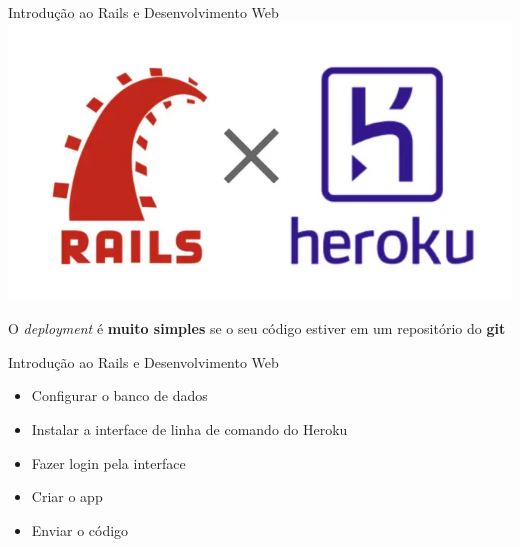 \documentclass[10pt]{beamer}
\begin{document}
\begin{frame}{Introdução ao Rails e Desenvolvimento Web}
  \centering
  \includegraphics[width=\textwidth]{images/rails_heroku.png}

  \raggedright
  O \textit{deployment} é \textbf{muito simples} se o seu código estiver em um repositório do \textbf{git}
\end{frame}

\begin{frame}{Introdução ao Rails e Desenvolvimento Web}
  \Large
  \begin{itemize}
    \item Configurar o banco de dados
    \item Instalar a interface de linha de comando do Heroku
    \item Fazer login pela interface
    \item Criar o app
    \item Enviar o código
  \end{itemize}
\end{frame}
\end{document}

